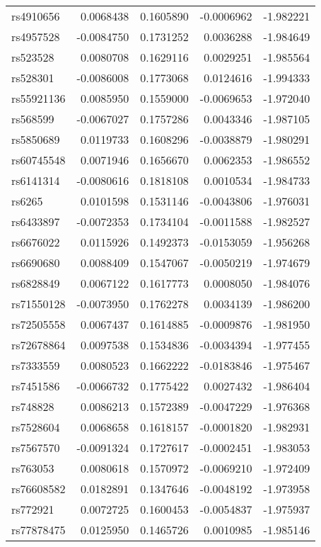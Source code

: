 \documentclass[
]{article}
\theoremstyle{plain}
\begin{document}
\begin{longtable}[t]{lrrrr}
rs4910656 & 0.0068438 & 0.1605890 & -0.0006962 & -1.982221\\
rs4957528 & -0.0084750 & 0.1731252 & 0.0036288 & -1.984649\\
rs523528 & 0.0080708 & 0.1629116 & 0.0029251 & -1.985564\\
rs528301 & -0.0086008 & 0.1773068 & 0.0124616 & -1.994333\\
rs55921136 & 0.0085950 & 0.1559000 & -0.0069653 & -1.972040\\
\addlinespace
rs568599 & -0.0067027 & 0.1757286 & 0.0043346 & -1.987105\\
rs5850689 & 0.0119733 & 0.1608296 & -0.0038879 & -1.980291\\
rs60745548 & 0.0071946 & 0.1656670 & 0.0062353 & -1.986552\\
rs6141314 & -0.0080616 & 0.1818108 & 0.0010534 & -1.984733\\
rs6265 & 0.0101598 & 0.1531146 & -0.0043806 & -1.976031\\
\addlinespace
rs6433897 & -0.0072353 & 0.1734104 & -0.0011588 & -1.982527\\
rs6676022 & 0.0115926 & 0.1492373 & -0.0153059 & -1.956268\\
rs6690680 & 0.0088409 & 0.1547067 & -0.0050219 & -1.974679\\
rs6828849 & 0.0067122 & 0.1617773 & 0.0008050 & -1.984076\\
rs71550128 & -0.0073950 & 0.1762278 & 0.0034139 & -1.986200\\
\addlinespace
rs72505558 & 0.0067437 & 0.1614885 & -0.0009876 & -1.981950\\
rs72678864 & 0.0097538 & 0.1534836 & -0.0034394 & -1.977455\\
rs7333559 & 0.0080523 & 0.1662222 & -0.0183846 & -1.975467\\
rs7451586 & -0.0066732 & 0.1775422 & 0.0027432 & -1.986404\\
rs748828 & 0.0086213 & 0.1572389 & -0.0047229 & -1.976368\\
\addlinespace
rs7528604 & 0.0068658 & 0.1618157 & -0.0001820 & -1.982931\\
rs7567570 & -0.0091324 & 0.1727617 & -0.0002451 & -1.983053\\
rs763053 & 0.0080618 & 0.1570972 & -0.0069210 & -1.972409\\
rs76608582 & 0.0182891 & 0.1347646 & -0.0048192 & -1.973958\\
rs772921 & 0.0072725 & 0.1600453 & -0.0054837 & -1.975937\\
\addlinespace
rs77878475 & 0.0125950 & 0.1465726 & 0.0010985 & -1.985146\\

\end{longtable}
\end{document}
